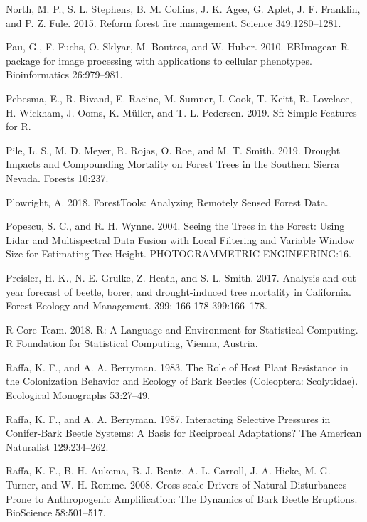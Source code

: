 \documentclass[]{article}
\begin{document}
\hypertarget{ref-north2015}{}
North, M. P., S. L. Stephens, B. M. Collins, J. K. Agee, G. Aplet, J. F.
Franklin, and P. Z. Fule. 2015. Reform forest fire management. Science
349:1280--1281.

\hypertarget{ref-pau2010}{}
Pau, G., F. Fuchs, O. Sklyar, M. Boutros, and W. Huber. 2010. EBImagean
R package for image processing with applications to cellular phenotypes.
Bioinformatics 26:979--981.

\hypertarget{ref-pebesma2019}{}
Pebesma, E., R. Bivand, E. Racine, M. Sumner, I. Cook, T. Keitt, R.
Lovelace, H. Wickham, J. Ooms, K. Müller, and T. L. Pedersen. 2019. Sf:
Simple Features for R.

\hypertarget{ref-pile2019}{}
Pile, L. S., M. D. Meyer, R. Rojas, O. Roe, and M. T. Smith. 2019.
Drought Impacts and Compounding Mortality on Forest Trees in the
Southern Sierra Nevada. Forests 10:237.

\hypertarget{ref-plowright2018}{}
Plowright, A. 2018. ForestTools: Analyzing Remotely Sensed Forest Data.

\hypertarget{ref-popescu2004}{}
Popescu, S. C., and R. H. Wynne. 2004. Seeing the Trees in the Forest:
Using Lidar and Multispectral Data Fusion with Local Filtering and
Variable Window Size for Estimating Tree Height. PHOTOGRAMMETRIC
ENGINEERING:16.

\hypertarget{ref-preisler2017}{}
Preisler, H. K., N. E. Grulke, Z. Heath, and S. L. Smith. 2017. Analysis
and out-year forecast of beetle, borer, and drought-induced tree
mortality in California. Forest Ecology and Management. 399: 166-178
399:166--178.

\hypertarget{ref-rcoreteam2018}{}
R Core Team. 2018. R: A Language and Environment for Statistical
Computing. R Foundation for Statistical Computing, Vienna, Austria.

\hypertarget{ref-raffa1983}{}
Raffa, K. F., and A. A. Berryman. 1983. The Role of Host Plant
Resistance in the Colonization Behavior and Ecology of Bark Beetles
(Coleoptera: Scolytidae). Ecological Monographs 53:27--49.

\hypertarget{ref-raffa1987}{}
Raffa, K. F., and A. A. Berryman. 1987. Interacting Selective Pressures
in Conifer-Bark Beetle Systems: A Basis for Reciprocal Adaptations? The
American Naturalist 129:234--262.

\hypertarget{ref-raffa2008}{}
Raffa, K. F., B. H. Aukema, B. J. Bentz, A. L. Carroll, J. A. Hicke, M.
G. Turner, and W. H. Romme. 2008. Cross-scale Drivers of Natural
Disturbances Prone to Anthropogenic Amplification: The Dynamics of Bark
Beetle Eruptions. BioScience 58:501--517.
\end{document}
